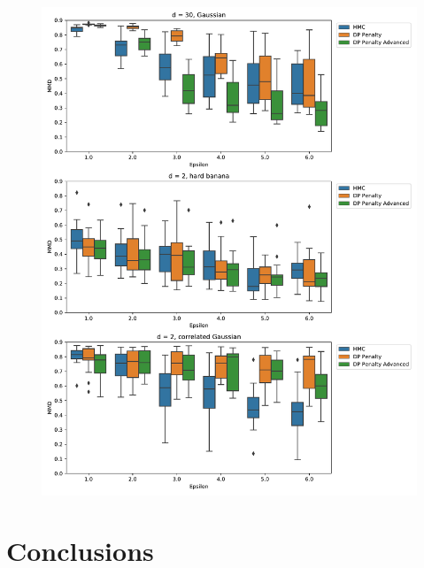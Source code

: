 \documentclass[english,twoside,openright]{HYgraduMLDS}
\begin{document}
\begin{figure}
  \centering
  \includegraphics[width=\textwidth]{figures/banana_extra.pdf}

  \label{banana_extra_mmd_fig}
\end{figure}

\chapter{Conclusions}

\cleardoublepage %



%
%
\end{document}

